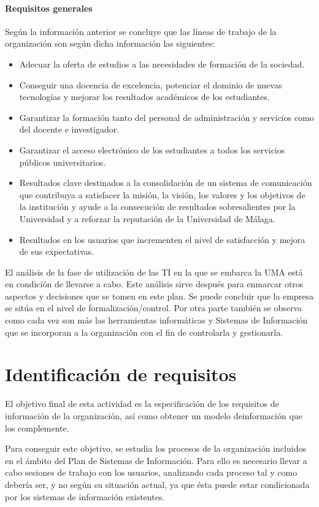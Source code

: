 \documentclass[11pt,a4paper,spanish,twoside]{report}
\begin{document}
\subsubsection{Requisitos generales}
Según la información anterior se concluye que las líneas de trabajo de
la organización son según dicha información las siguientes: 
\begin{itemize}
\item Adecuar la oferta de estudios a las necesidades de formación de la
  sociedad.
\item Conseguir una docencia de excelencia, potenciar el dominio de nuevas
  tecnologías y mejorar los resultados académicos de los estudiantes.
\item Garantizar la formación tanto del personal de administración y servicios
  como del docente e investigador.
\item Garantizar el acceso electrónico de los estudiantes a todos los servicios
  públicos universitarios.
\item Resultados clave destinados a la consolidación de un sistema de
  comunicación que contribuya a satisfacer la misión, la visión, los valores
  y los objetivos de la institución y ayude a la consecución de resultados
  sobresalientes por la Universidad y a reforzar la reputación de la
  Universidad de Málaga.
\item Resultados en los usuarios que incrementen el nivel de satisfacción y
  mejora de sus expectativas.
\end{itemize}
        
El análisis de la fase de utilización de las TI en la que se embarca la 
UMA está en condición de llevarse a cabo. Este análisis sirve después
para enmarcar otros aspectos y decisiones que se tomen en este plan. Se puede
concluir que la empresa se sitúa en el nivel de formalización/control. Por
otra parte también se observa como cada vez son más las herramientas
informáticas y Sistemas de Información que se incorporan a la organización
con el fin de controlarla y gestionarla. 

\chapter{Identificación de requisitos}
El objetivo final de esta actividad es la especificación de los requisitos
de información de la organización, así como obtener un modelo deinformación 
que los complemente.

Para conseguir este objetivo, se estudia los procesos de la organización 
incluidos en el ámbito del Plan de Sistemas de Información. Para ello es 
necesario llevar a cabo sesiones de trabajo con los usuarios, analizando cada 
proceso tal y como debería ser, y no según su situación actual, ya que ésta 
puede estar condicionada por los sistemas de información existentes. 
\end{document}
